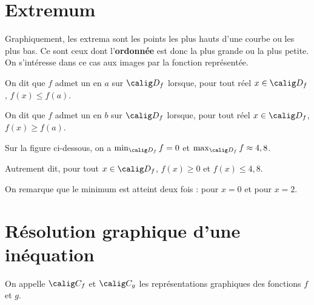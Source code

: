 \documentclass[10pt,openright,twoside,french]{book}
\begin{document}
\section{Extremum}
Graphiquement, les extrema sont les points les plus hauts d'une courbe ou les plus bas. Ce sont ceux dont l'\textbf{ordonnée} est donc la plus grande ou la plus petite. On s'intéresse dans ce cas aux images par la fonction représentée.\medskip

\begin{Defi}
    On dit que $f$ admet un  en $a$ sur $\calig D_f$ lorsque, pour tout réel $x \in \calig D_f$, $f(x) \leq f(a)$.\par
    On dit que $f$ admet un  en $b$ sur $\calig D_f$ lorsque, pour tout réel $x \in \calig D_f$, $f(x) \geq f(a)$.
\end{Defi}

\begin{Exemple}

Sur la figure ci-dessous, on a $\min_{\calig D_f} f = 0$ et $\max_{\calig D_f} f \approx 4,8$.\par
Autrement dit, pour tout $x \in \calig D_f$, $f(x) \geq 0$ et $f(x) \leq 4,8$.

\begin{center}
\end{center}

On remarque que le minimum est atteint deux fois : pour $x = 0$ et pour $x = 2$.
\end{Exemple}

\section{Résolution graphique d'une inéquation}
On appelle $\calig C_f$ et $\calig C_g$ les représentations graphiques des fonctions $f$ et $g$.
\end{document}
